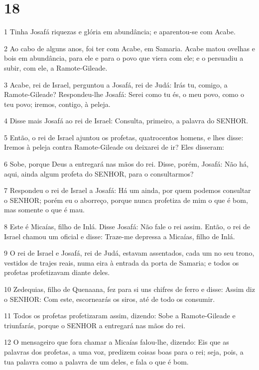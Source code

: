 \chapter{18}

\par 1 Tinha Josafá riquezas e glória em abundância; e aparentou-se com Acabe.
\par 2 Ao cabo de alguns anos, foi ter com Acabe, em Samaria. Acabe matou ovelhas e bois em abundância, para ele e para o povo que viera com ele; e o persuadiu a subir, com ele, a Ramote-Gileade.
\par 3 Acabe, rei de Israel, perguntou a Josafá, rei de Judá: Irás tu, comigo, a Ramote-Gileade? Respondeu-lhe Josafá: Serei como tu és, o meu povo, como o teu povo; iremos, contigo, à peleja.
\par 4 Disse mais Josafá ao rei de Israel: Consulta, primeiro, a palavra do SENHOR.
\par 5 Então, o rei de Israel ajuntou os profetas, quatrocentos homens, e lhes disse: Iremos à peleja contra Ramote-Gileade ou deixarei de ir? Eles disseram:
\par 6 Sobe, porque Deus a entregará nas mãos do rei. Disse, porém, Josafá: Não há, aqui, ainda algum profeta do SENHOR, para o consultarmos?
\par 7 Respondeu o rei de Israel a Josafá: Há um ainda, por quem podemos consultar o SENHOR; porém eu o aborreço, porque nunca profetiza de mim o que é bom, mas somente o que é mau.
\par 8 Este é Micaías, filho de Inlá. Disse Josafá: Não fale o rei assim. Então, o rei de Israel chamou um oficial e disse: Traze-me depressa a Micaías, filho de Inlá.
\par 9 O rei de Israel e Josafá, rei de Judá, estavam assentados, cada um no seu trono, vestidos de trajes reais, numa eira à entrada da porta de Samaria; e todos os profetas profetizavam diante deles.
\par 10 Zedequias, filho de Quenaana, fez para si uns chifres de ferro e disse: Assim diz o SENHOR: Com este, escornearás os siros, até de todo os consumir.
\par 11 Todos os profetas profetizaram assim, dizendo: Sobe a Ramote-Gileade e triunfarás, porque o SENHOR a entregará nas mãos do rei.
\par 12 O mensageiro que fora chamar a Micaías falou-lhe, dizendo: Eis que as palavras dos profetas, a uma voz, predizem coisas boas para o rei; seja, pois, a tua palavra como a palavra de um deles, e fala o que é bom.
